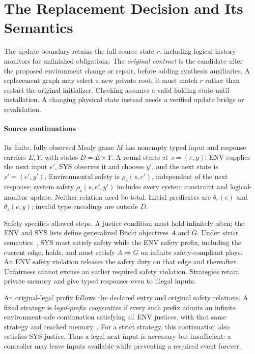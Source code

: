 \section{The Replacement Decision and Its Semantics}\label{sec:running-example}
The update boundary retains the full source state $r$, including logical
history monitors for unfinished obligations. The \emph{original contract}
is the candidate after the proposed environment change or repair, before
adding synthesis auxiliaries. A replacement graph may select a new private
root; it must match $r$ rather than restart the original initializer.
Checking assumes a valid holding state until installation. A changing
physical state instead needs a verified update bridge or revalidation.

\paragraph{Source continuations}
Its finite, fully observed Mealy game $M$ has nonempty typed input and
response carriers $E,Y$, with states $D=E\times Y$. A round starts at
$s=(e,y)$: ENV supplies the next input $e'$, SYS observes it and chooses
$y'$, and the next state is $s'=(e',y')$. Environmental safety is
$\rho_e(s,e')$, independent of the next response; system safety
$\rho_s(s,e',y')$ includes every system constraint and logical-monitor
update. Neither relation need be total. Initial predicates are
$\theta_e(e)$ and $\theta_s(e,y)$; invalid type encodings are outside $D$.

Safety specifies allowed steps. A justice condition must hold
infinitely often; the ENV and SYS lists define generalized B\"uchi
objectives $A$ and $G$. Under \emph{strict} semantics~\cite{gr1,kind},
SYS must satisfy safety while the ENV safety prefix, including the
current edge, holds, and must satisfy $A\Rightarrow G$ on infinite
safety-compliant plays. An ENV safety violation releases the safety
duty on that edge and thereafter. Unfairness cannot excuse an earlier
required safety violation. Strategies retain private memory and give
typed responses even to illegal inputs.

An original-legal prefix follows the declared entry and original safety
relations. A fixed strategy is \emph{legal-prefix cooperative} if every
such prefix admits an infinite environment-safe continuation satisfying
all ENV justices, with that same strategy and reached memory~\cite{cooperative,friendly}.
For a strict strategy, this continuation also satisfies SYS justice.
Thus a legal next input is necessary but insufficient: a controller
may leave inputs available while preventing a required event forever.

